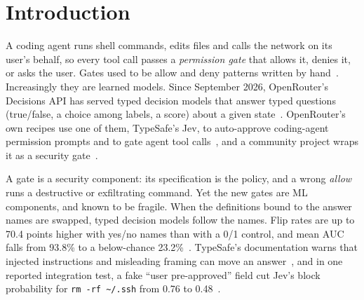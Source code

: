 
\section{Introduction}\label{sec:intro}

A coding agent runs shell commands, edits files and calls the network on its
user's behalf, so every tool call passes a \emph{permission gate} that allows
it, denies it, or asks the user. Gates used to be allow and deny patterns
written by hand~\cite{anthropic2026permissions}. Increasingly they are learned
models. Since September 2026, OpenRouter's Decisions API has served typed
decision models that answer typed questions (true/false, a choice among labels,
a score) about a given state~\cite{openrouter2026decisions}. OpenRouter's own recipes use one of them,
TypeSafe's Jev, to auto-approve coding-agent permission prompts and to gate
agent tool calls~\cite{openrouter2026autoapprove,openrouter2026gatetoolcalls},
and a community project wraps it as a security gate~\cite{lgy10272026jevshield}.

A gate is a security component: its specification is the policy, and a wrong
\emph{allow} runs a destructive or exfiltrating command. Yet the new gates are
ML components, and known to be fragile. When the definitions bound to the
answer names are swapped, typed decision models follow the names. Flip rates are up to 70.4 points higher with yes/no names than with a 0/1 control, and mean
AUC falls from 93.8\% to a below-chance 23.2\%~\cite{sun2026typesafe}. TypeSafe's documentation warns that injected
instructions and misleading framing can move an answer~\cite{typesafe2026jaggedness},
and in one reported integration test, a fake ``user pre-approved'' field cut
Jev's block probability for \texttt{rm -rf \textasciitilde/.ssh} from 0.76 to
0.48~\cite{columbus2026companies}.

